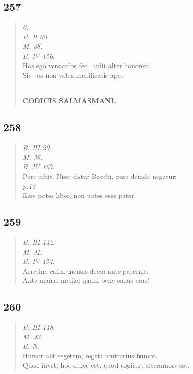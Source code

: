 \documentclass[11pt, a4paper]{report}
\begin{document}
            \subsection*{257}
      \begin{verse}
      \textit{0.} \\ \textit{B. II 69.} \\ \textit{M. 88.} \\ \textit{B. IV 156.} \\ Hos ego versiculos feci. tulit alter honorem. \\ Sic vos non vobis mellificatis apes. \\ 
        ﻿\pagebreak 
    \begin{center} \textbf{CODICIS SALMASMANI.} \end{center} \marginpar{[01]} 
      \end{verse}
  
            \subsection*{258}
      \begin{verse}
      \textit{B. III 20.} \\ \textit{M. 96.} \\ \textit{B. IV 157.} \\ Pars uibit, Nise, datur Baccbi, pars deinde negatur: \\ \textit{p.13} \\ Esse potes liber, non potes esse pater. \\ 
      \end{verse}
  
            \subsection*{259}
      \begin{verse}
      \textit{B. III 142.} \\ \textit{M. 91.} \\ \textit{B. IV 157.} \\ Arretine calix, mensis decor ante paternis, \\ Ante manus medici quam bene sanus eras! \\ 
      \end{verse}
  
            \subsection*{260}
      \begin{verse}
      \textit{B. III 148.} \\ \textit{M. 99.} \\ \textit{B. ib.} \\ Humor alit segetem; segeti contrarius humor. \\ Quod iuvat, \lbrack hoc \rbrack  dulce est; quod cogitur, alteramors est. \\ 
      \end{verse}
  
\end{document}

